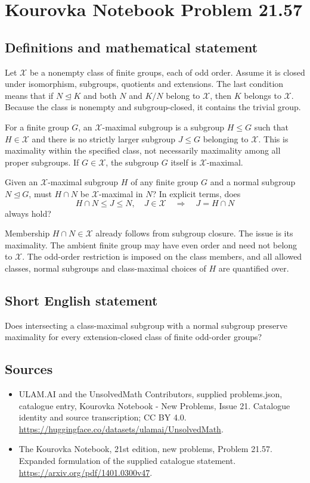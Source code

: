 \documentclass[11pt,a4paper]{article}
\begin{document}
\section*{Kourovka Notebook Problem 21.57}\label{statement}

\subsection{Definitions and mathematical statement}
Let $\mathcal X$ be a nonempty class of finite groups, each of odd
order. Assume it is closed under isomorphism, subgroups, quotients and
extensions. The last condition means that if $N\trianglelefteq K$ and
both $N$ and $K/N$ belong to $\mathcal X$, then $K$ belongs to
$\mathcal X$. Because the class is nonempty and subgroup-closed,
it contains the trivial group.

For a finite group $G$, an $\mathcal X$-maximal subgroup is a subgroup
$H\le G$ such that $H\in\mathcal X$ and there is no strictly larger
subgroup $J\le G$ belonging to $\mathcal X$.
This is maximality within the specified class, not necessarily maximality
among all proper subgroups. If $G\in\mathcal X$, the subgroup $G$
itself is $\mathcal X$-maximal.

Given an $\mathcal X$-maximal subgroup $H$ of any finite group $G$
and a normal subgroup $N\trianglelefteq G$, must $H\cap N$ be
$\mathcal X$-maximal in $N$? In explicit terms, does
\[
 H\cap N\le J\le N,\quad J\in\mathcal X
 \quad\Longrightarrow\quad J=H\cap N
\]
always hold?

Membership $H\cap N\in\mathcal X$ already follows from subgroup
closure. The issue is its maximality. The ambient finite group may
have even order and need not belong to $\mathcal X$. The odd-order
restriction is imposed on the class members, and all allowed classes,
normal subgroups and class-maximal choices of $H$ are quantified over.
\subsection{Short English statement}
Does intersecting a class-maximal subgroup with a normal subgroup preserve maximality for every extension-closed class of finite odd-order groups?
\subsection{Sources}
\begin{itemize}
\item[S1] ULAM.AI and the UnsolvedMath Contributors, supplied problems.json, catalogue entry, Kourovka Notebook - New Problems, Issue 21. Catalogue identity and source transcription; CC BY 4.0.
\url{https://huggingface.co/datasets/ulamai/UnsolvedMath}.
\item[S2] The Kourovka Notebook, 21st edition, new problems, Problem 21.57. Expanded formulation of the supplied catalogue statement.
\url{https://arxiv.org/pdf/1401.0300v47}.
\end{itemize}
\end{document}
